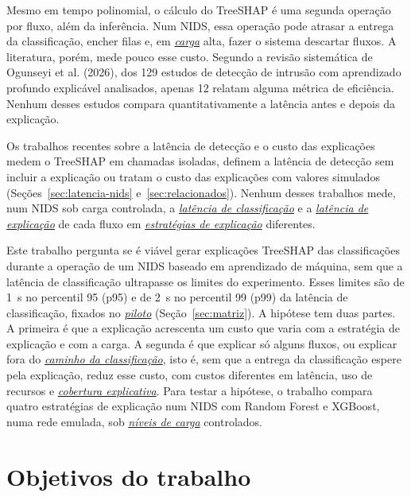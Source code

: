 \documentclass[
  12pt,
  oneside,
  a4paper,
  chapter=TITLE,
  sumario=tradicional,
  english,
  brazil
]{abntex2}
\newcommand{\termo}[2]{\hyperref[gl:#1]{\emph{#2}}}
\begin{document}
Mesmo em tempo polinomial, o cálculo do TreeSHAP é uma segunda operação por fluxo, além da
inferência. Num NIDS, essa operação pode atrasar a entrega da classificação, encher filas e, em
\termo{carga}{carga} alta, fazer o sistema descartar fluxos. A literatura, porém, mede pouco esse
custo. Segundo a revisão sistemática de Ogunseyi et al. (2026), dos 129 estudos de detecção de
intrusão com aprendizado profundo explicável analisados, apenas 12 relatam alguma métrica de
eficiência. Nenhum desses estudos compara quantitativamente a latência antes e depois da
explicação.

Os trabalhos recentes sobre a latência de detecção e o custo das explicações medem o TreeSHAP em
chamadas isoladas, definem a latência de detecção sem incluir a explicação ou tratam o custo das
explicações com valores simulados (Seções~\ref{sec:latencia-nids} e~\ref{sec:relacionados}).
Nenhum desses trabalhos mede, num NIDS sob carga
controlada, a \termo{latencia-classificacao}{latência de classificação} e a
\termo{latencia-explicacao}{latência de explicação} de cada fluxo em
\termo{estrategia}{estratégias de explicação} diferentes.

Este trabalho pergunta se é viável gerar explicações TreeSHAP das classificações durante a operação
de um NIDS baseado em aprendizado de máquina, sem que a latência de classificação ultrapasse os
limites do experimento. Esses limites são de 1~s no percentil 95 (p95) e de 2~s no percentil 99
(p99) da latência de classificação, fixados no \termo{piloto}{piloto} (Seção~\ref{sec:matriz}). A hipótese tem
duas partes. A primeira é que a explicação acrescenta um custo que varia com a estratégia de
explicação e com a carga. A segunda é que explicar só alguns fluxos, ou explicar fora do
\termo{caminho}{caminho da classificação}, isto é, sem que a entrega da classificação espere pela
explicação, reduz esse custo, com custos diferentes em latência, uso de recursos e
\termo{cobertura-explicativa}{cobertura explicativa}. Para testar a hipótese, o trabalho compara
quatro estratégias de explicação num NIDS com Random Forest e XGBoost, numa rede emulada, sob
\termo{nivel-carga}{níveis de carga} controlados.

\section{Objetivos do trabalho}
\end{document}
